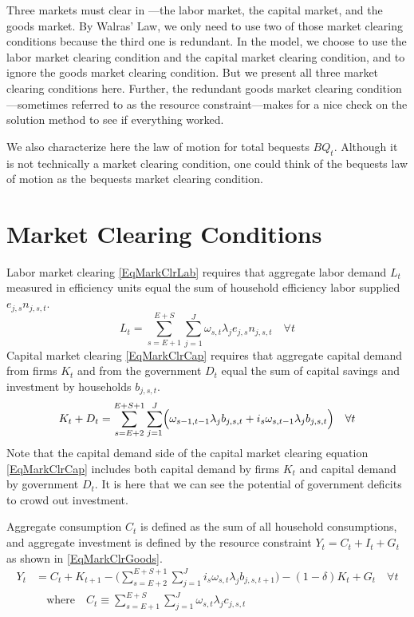 
Three markets must clear in \ogindia---the labor market, the capital market, and the goods market. By Walras' Law, we only need to use two of those market clearing conditions because the third one is redundant. In the model, we choose to use the labor market clearing condition and the capital market clearing condition, and to ignore the goods market clearing condition. But we present all three market clearing conditions here. Further, the redundant goods market clearing condition---sometimes referred to as the resource constraint---makes for a nice check on the solution method to see if everything worked.

We also characterize here the law of motion for total bequests $BQ_t$. Although it is not technically a market clearing condition, one could think of the bequests law of motion as the bequests market clearing condition.

\section{Market Clearing Conditions}\label{SecMarkClrMktClr}

  Labor market clearing \eqref{EqMarkClrLab} requires that aggregate labor demand $L_t$ measured in efficiency units equal the sum of household efficiency labor supplied $e_{j,s}n_{j,s,t}$.
  \begin{equation}\label{EqMarkClrLab}
    L_t = \sum_{s=E+1}^{E+S}\sum_{j=1}^{J} \omega_{s,t}\lambda_j e_{j,s}n_{j,s,t} \quad \forall t
  \end{equation}
  Capital market clearing \eqref{EqMarkClrCap} requires that aggregate capital demand from firms $K_t$ and from the government $D_t$ equal the sum of capital savings and investment by households $b_{j,s,t}$.
  \begin{equation}\label{EqMarkClrCap}
    K_t + D_t = \sum_{s=E+2}^{E+S+1}\sum_{j=1}^{J}\Bigl(\omega_{s-1,t-1}\lambda_j b_{j,s,t} + i_s\omega_{s,t-1}\lambda_j b_{j,s,t}\Bigr) \quad \forall t
  \end{equation}
  Note that the capital demand side of the capital market clearing equation \eqref{EqMarkClrCap} includes both capital demand by firms $K_t$ and capital demand by government $D_t$. It is here that we can see the potential of government deficits to crowd out investment.

  Aggregate consumption $C_t$ is defined as the sum of all household consumptions, and aggregate investment is defined by the resource constraint $Y_t = C_t + I_t + G_t$ as shown in \eqref{EqMarkClrGoods}.
  \begin{equation}\label{EqMarkClrGoods}
    \begin{split}
      Y_t &= C_t + K_{t+1} - \biggl(\sum_{s=E+2}^{E+S+1}\sum_{j=1}^{J}i_s\omega_{s,t}\lambda_j b_{j,s,t+1}\biggr) - (1-\delta)K_t + G_t \quad\forall t \\
      &\quad\text{where}\quad C_t \equiv \sum_{s=E+1}^{E+S}\sum_{j=1}^{J}\omega_{s,t}\lambda_j c_{j,s,t}
    \end{split}
  \end{equation}

